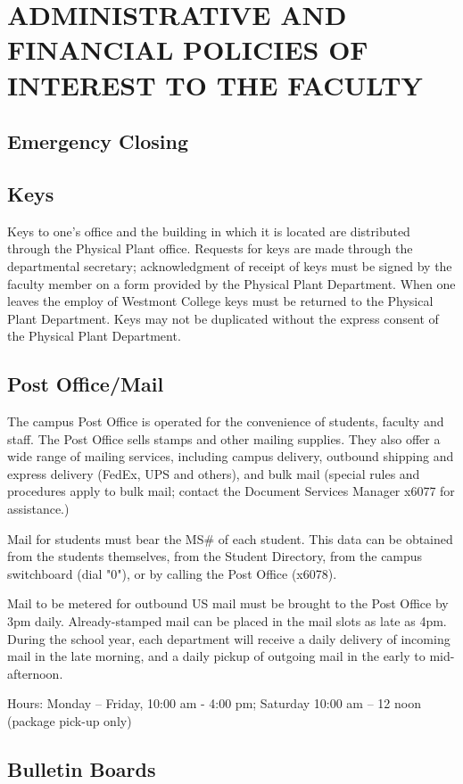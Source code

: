 \section{ADMINISTRATIVE AND FINANCIAL POLICIES OF INTEREST TO THE FACULTY}
	\subsection{Emergency Closing} 
	\subsection{Keys}
		Keys to one's office and the building in which it is located are distributed through the Physical Plant office.  Requests for keys are made through the departmental secretary; acknowledgment of receipt of keys must be signed by the faculty member on a form provided by the Physical Plant Department.  When one leaves the employ of Westmont College keys must be returned to the Physical Plant Department.  Keys may not be duplicated without the express consent of the Physical Plant Department.
	\subsection{Post Office/Mail}
		The campus Post Office is operated for the convenience of students, faculty and staff. The Post Office sells stamps and other mailing supplies. They also offer a wide range of mailing services, including campus delivery, outbound shipping and express delivery (FedEx, UPS and others), and bulk mail (special rules and procedures apply to bulk mail; contact the Document Services Manager x6077 for assistance.)

		Mail for students must bear the MS\# of each student. This data can be obtained from the students themselves, from the Student Directory, from the campus switchboard (dial "0"), or by calling the Post Office (x6078).

		Mail to be metered for outbound US mail must be brought to the Post Office by 3pm daily. Already-stamped mail can be placed in the mail slots as late as 4pm. During the school year, each department will receive a daily delivery of incoming mail in the late morning, and a daily pickup of outgoing mail in the early to mid-afternoon.

		Hours:  Monday -- Friday, 10:00 am - 4:00 pm; Saturday 10:00 am -- 12 noon (package pick-up only)
	\subsection{Bulletin Boards}
